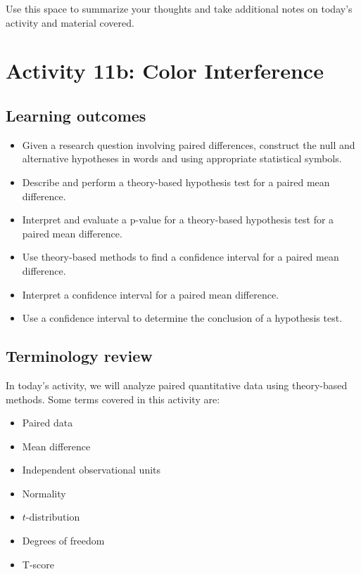 \documentclass[
]{report}
\begin{document}
Use this space to summarize your thoughts and take additional notes on today's activity and material covered.

\newpage

\hypertarget{activity-11b-color-interference}{%
\section{Activity 11b: Color Interference}\label{activity-11b-color-interference}}


\hypertarget{learning-outcomes-6}{%
\subsection{Learning outcomes}\label{learning-outcomes-6}}

\begin{itemize}
\item
  Given a research question involving paired differences, construct the null and alternative hypotheses
  in words and using appropriate statistical symbols.
\item
  Describe and perform a theory-based hypothesis test for a paired mean difference.
\item
  Interpret and evaluate a p-value for a theory-based hypothesis test for a paired mean difference.
\item
  Use theory-based methods to find a confidence interval for a paired mean difference.
\item
  Interpret a confidence interval for a paired mean difference.
\item
  Use a confidence interval to determine the conclusion of a hypothesis test.
\end{itemize}

\hypertarget{terminology-review-17}{%
\subsection{Terminology review}\label{terminology-review-17}}

In today's activity, we will analyze paired quantitative data using theory-based methods. Some terms covered in this activity are:

\begin{itemize}
\item
  Paired data
\item
  Mean difference
\item
  Independent observational units
\item
  Normality
\item
  \(t\)-distribution
\item
  Degrees of freedom
\item
  T-score
\end{itemize}
\end{document}

